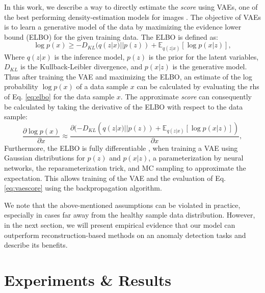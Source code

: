 \documentclass{article}
\begin{document}
In this work, we describe a way to directly estimate the \textit{score} using VAEs, one of the best performing density-estimation models for images \cite{chen_deep_2018,kiran_overview_2018}.
The objective of VAEs is to learn a generative model of the data by maximizing the evidence lower bound (ELBO) for the given training data. 
The ELBO is defined as:
\begin{equation}
\label{eq:elbo}
\log p(x) \geq -D_{KL}(q(z|x) || p(z)) + \mathbb{E}_{q(z|x)} [\log p(x|z)],
\end{equation}
Where $q(z|x)$ is the inference model, $p(z)$ is the prior for the latent variables, $D_{KL}$ is the Kullback-Leibler divergence, and $p(x|z)$ is the generative model.
Thus after training the VAE and maximizing the ELBO, an estimate of the log probability $\log p(x)$ of a data sample $x$ can be calculated by evaluating the rhs of Eq. \ref{eq:elbo} for the data sample $x$.
The approximate \textit{score} can consequently be calculated by taking the derivative of the ELBO with respect to the data sample:
\begin{equation}
\label{eq:vaescore}
\frac{\partial \log p(x)}{\partial x} \approx \frac{\partial (-D_{KL}(q(z|x) || p(z)) + \mathbb{E}_{q(z|x)} [\log p(x|z)])}{\partial x},
\end{equation}
Furthermore, the ELBO is fully differentiable \cite{kingma_auto-encoding_2013,rezende_stochastic_2014}, when training a VAE using Gaussian distributions for $p(z)$ and $p(x|z)$, a parameterization by neural networks, the reparameterization trick, and MC sampling to approximate the expectation.
This allows training of the VAE and the evaluation of Eq. \ref{eq:vaescore} using the backpropagation algorithm.

We note that the above-mentioned assumptions
can be violated in practice, especially in cases far away from the healthy sample data distribution. However, in the next section, we will present empirical evidence that our model can outperform reconstruction-based methods on an anomaly detection tasks and describe its benefits.





\section{Experiments \& Results}
\end{document}
